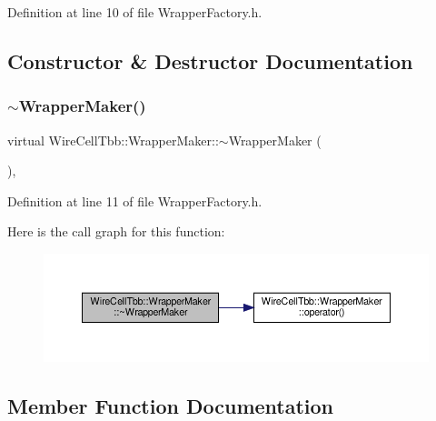 Definition at line 10 of file Wrapper\+Factory.\+h.



\subsection{Constructor \& Destructor Documentation}
\mbox{\label{struct_wire_cell_tbb_1_1_wrapper_maker_a7f76e2a875975d1f8b90a5f1783b448b}} 
\subsubsection{\texorpdfstring{$\sim$\+Wrapper\+Maker()}{~WrapperMaker()}}
{\footnotesize\ttfamily virtual Wire\+Cell\+Tbb\+::\+Wrapper\+Maker\+::$\sim$\+Wrapper\+Maker (\begin{DoxyParamCaption}{ }\end{DoxyParamCaption})\hspace{0.3cm}{\ttfamily [inline]}, {\ttfamily [virtual]}}



Definition at line 11 of file Wrapper\+Factory.\+h.

Here is the call graph for this function\+:
\nopagebreak
\begin{figure}[H]
\begin{center}
\leavevmode
\includegraphics[width=350pt]{struct_wire_cell_tbb_1_1_wrapper_maker_a7f76e2a875975d1f8b90a5f1783b448b_cgraph}
\end{center}
\end{figure}


\subsection{Member Function Documentation}
\mbox{\label{struct_wire_cell_tbb_1_1_wrapper_maker_a65fa28063bf58c1358a2fc602d42cb42}} 
